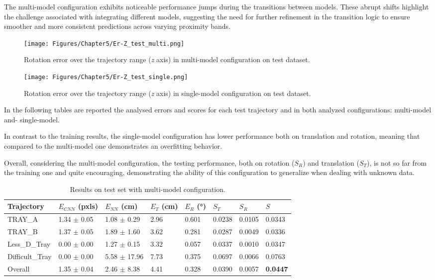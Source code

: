 \newpage
The multi-model configuration exhibits noticeable performance jumps during the transitions between models. These abrupt shifts highlight the challenge associated with integrating different models, suggesting the need for further refinement in the transition logic to ensure smoother and more consistent predictions across varying proximity bands.

\begin{figure}[H]
    \centering
    \texttt{[image: Figures/Chapter5/Er-Z\_test\_multi.png]}
    \caption[Rotation error over the trajectory range in multi-model configuration on test dataset.]{Rotation error over the trajectory range (\textit{z} axis) in multi-model configuration on test dataset.}
    \label{fig:Er test models}
\end{figure}
\begin{figure}[H]
    \centering
    \texttt{[image: Figures/Chapter5/Er-Z\_test\_single.png]}
    \caption[Rotation error over the trajectory range in single-model configuration on test dataset.]{Rotation error over the trajectory range (\textit{z} axis) in single-model configuration on test dataset.}
    \label{fig:Er test single}
\end{figure}

\newpage
In the following tables are reported the analysed errors and scores for each test trajectory and in both analyzed configurations: multi-model and- single-model.

In contrast to the training results, the single-model configuration has lower performance both on translation and rotation, meaning that compared to the multi-model one demonstrates an overfitting behavior.

Overall, considering the multi-model configuration, the testing performance, both on rotation ($S_R$) and  translation ($S_T$), is not so far from the training one and quite encouraging, demonstrating the ability of this configuration to generalize when dealing with unknown data.

\begin{table}[H]
\label{tab:multi-model test results}
\centering
\begin{tabular}{l | l l l l | l l | l}
\toprule
Trajectory & $E_{CNN}$ (pxls) & $E_{NN}$ (cm) & $E_T$ (cm)& $E_R$ (°)& $S_T$ & $S_R$ & $S$\\
\midrule
TRAY\_A & 1.34 $\pm$ 0.05 & 1.08 $\pm$ 0.29 & 2.96 & 0.601 & 0.0238 & 0.0105 & 0.0343\\
TRAY\_B & 1.37 $\pm$ 0.05 & 1.89 $\pm$ 1.60 & 3.62 & 0.281 & 0.0287 & 0.0049 & 0.0336\\
Less\_D\_Tray & 0.00 $\pm$ 0.00 & 1.27 $\pm$ 0.15 & 3.32 & 0.057 & 0.0337 & 0.0010 & 0.0347\\
Difficult\_Tray & 0.00 $\pm$ 0.00 & 5.58 $\pm$ 17.96 & 7.73 & 0.375 & 0.0697 & 0.0066 & 0.0763\\
\midrule
Overall & 1.35 $\pm$ 0.04 & 2.46 $\pm$ 8.38 & 4.41 & 0.328 & 0.0390 & 0.0057 & \textbf{0.0447}\\
\bottomrule
\end{tabular}
\caption{Results on test set with multi-model configuration.}
\end{table}

